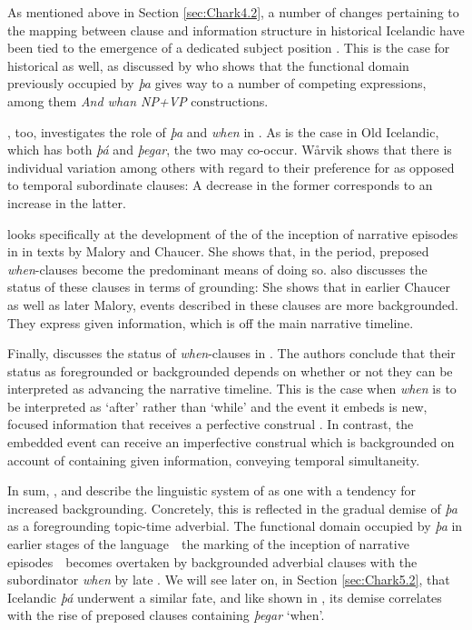 \documentclass[output=paper,colorlinks,citecolor=brown]{langscibook}
\begin{document}
As mentioned above in Section \ref{sec:Chark4.2}, a number of changes pertaining to the mapping between clause and information structure in historical Icelandic have been tied to the emergence of a dedicated subject position \citep{booth-beck20200jhs}. This is the case for historical  as well, as discussed by \citet{fludernik1995middle} who shows that the functional domain previously occupied by \textit{þa} gives way to a number of competing expressions, among them \textit{And whan NP+VP} constructions.

\citet{warvik1995a}, too, investigates the role of \textit{þa} and \textit{when} in . As is the case in Old Icelandic, which has both \textit{þá} and \textit{þegar}, the two may co-occur. Wårvik shows that there is individual variation among others with regard to their preference for  as opposed to temporal subordinate clauses: A decrease in the former corresponds to an increase in the latter.

\citet{Brinton1996} looks specifically at the development of the  of the inception of narrative episodes in  in texts by Malory and Chaucer. She shows that, in the  period, preposed \textit{when}-clauses become the predominant means of doing so. \citet{Brinton1996} also discusses the status of these clauses in terms of grounding: She shows that in earlier Chaucer as well as later Malory, events described in these clauses are more backgrounded. They express given information, which is off the main narrative timeline.

Finally, \citet{enkvist1987old} discusses the status of \textit{when}-clauses in . The authors conclude that their status as foregrounded or backgrounded depends on whether or not they can be interpreted as advancing the narrative timeline. This is the case when \textit{when} is to be interpreted as `after' rather than `while' and the event it embeds is new, focused information that receives a perfective construal \citep[876]{Fleischman1985}. In contrast, the embedded event can receive an imperfective construal which is backgrounded on account of containing given information, conveying temporal simultaneity. 

In sum, \citet{Brinton1996}, \citet{warvik1995a} and \citet{enkvist1987old} describe the linguistic system of  as one with a tendency for increased backgrounding. Concretely, this is reflected in the gradual demise of \textit{þa} as a foregrounding topic-time adverbial. The functional domain occupied by \textit{þa} in earlier stages of the language\ \textendash{}\  the marking of the inception of narrative episodes\ \textendash{}\  becomes overtaken by backgrounded adverbial clauses with the subordinator \textit{when} by late . We will see later on, in Section \ref{sec:Chark5.2}, that Icelandic \textit{þá} underwent a similar fate, and like shown in \citet{warvik1995a}, its demise correlates with the rise of preposed clauses containing \textit{þegar} `when'.
\end{document}
